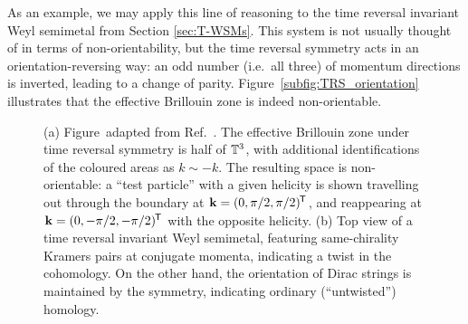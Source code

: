 As an example, we may apply this line of reasoning to the time reversal invariant Weyl semimetal from Section \ref{sec:T-WSMs}. This system is not usually thought of in terms of non-orientability, but the time reversal symmetry acts in an orientation-reversing way: an odd number (i.e.\ all three) of momentum directions is inverted, leading to a change of parity. Figure~\ref{subfig:TRS_orientation} illustrates that the effective Brillouin zone is indeed non-orientable.
\begin{figure}[htb!]
	\centering
	\hfil
	\caption{(a) Figure~adapted from Ref.~\cite{Thiang_equivariant}. The effective Brillouin zone under time reversal symmetry is half of $\mathbb{T}^3$, with additional identifications of the coloured areas as $k\sim -k$. The resulting space is non-orientable: a ``test particle'' with a given helicity is shown travelling out through the boundary at $\vb{k} = (0,\pi/2,\pi/2)^{\mkern-1.5mu\mathsf{T}}$, and reappearing at $\vb{k} = (0,-\pi/2,-\pi/2)^{\mkern-1.5mu\mathsf{T}}$ with the opposite helicity. (b) Top view of a time reversal invariant Weyl semimetal, featuring same-chirality Kramers pairs at conjugate momenta, indicating a twist in the cohomology. On the other hand, the orientation of Dirac strings is maintained by the symmetry, indicating ordinary (``untwisted'') homology.}
	\label{fig:TRS_twist}
\end{figure}
